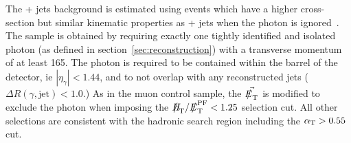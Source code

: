 The \znunu + jets background is estimated using \gj events which
have a higher cross-section but similar kinematic properties as 
\znunu + jets when the photon is ignored~\cite{PAS-SUS-08-002,Bern:2011pa}. 
The \gj sample is obtained by requiring exactly one tightly 
identified and isolated photon (as defined in section~\ref{sec:reconstruction})
with a transverse momentum of at least 165\gev. The photon is required 
to be contained within the barrel of the detector, ie $|\eta_{\gamma}| <1.44$, 
and to not overlap with any reconstructed jets ($\Delta R(\gamma,\textrm{jet}) < 1.0$.)
As in the muon control sample, the $\metvec$ is modified to exclude the photon 
when imposing the $\mht/\pfmet<1.25$ selection cut.  All other selections are 
consistent with the hadronic search region including the $\alpha_{\text{T}} > 0.55$ cut.

%
%

